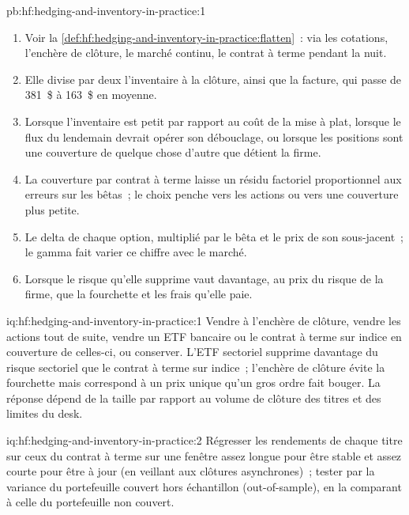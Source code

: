 \begin{solution}{pb:hf:hedging-and-inventory-in-practice:1}
\begin{enumerate}
\item Voir la \cref{def:hf:hedging-and-inventory-in-practice:flatten}~: via les cotations, l'enchère de clôture, le marché continu, le contrat à terme
pendant la nuit.
\item Elle divise par deux l'inventaire à la clôture, ainsi que la facture, qui passe de 381~\$ à 163~\$ en moyenne.
\item Lorsque l'inventaire est petit par rapport au coût de la mise à plat, lorsque le flux du lendemain devrait opérer son débouclage, ou lorsque les positions sont une couverture de
quelque chose d'autre que détient la firme.
\item La couverture par contrat à terme laisse un résidu factoriel proportionnel aux erreurs sur les bêtas~; le choix penche vers les actions ou vers une couverture plus petite.
\item Le delta de chaque option, multiplié par le bêta et le prix de son sous-jacent~; le gamma fait varier ce chiffre avec le marché.
\item Lorsque le risque qu'elle supprime vaut davantage, au prix du risque de la firme, que la fourchette et les frais qu'elle paie.
\end{enumerate}
\end{solution}

\begin{solution}{iq:hf:hedging-and-inventory-in-practice:1}
Vendre à l'enchère de clôture, vendre les actions tout de suite, vendre un ETF bancaire ou le contrat à terme sur indice en couverture de celles-ci, ou conserver. L'ETF sectoriel supprime davantage du
risque sectoriel que le contrat à terme sur indice~; l'enchère de clôture évite la fourchette mais correspond à un prix unique qu'un gros ordre fait bouger. La réponse dépend de la
taille par rapport au volume de clôture des titres et des limites du desk.
\end{solution}

\begin{solution}{iq:hf:hedging-and-inventory-in-practice:2}
Régresser les rendements de chaque titre sur ceux du contrat à terme sur une fenêtre assez longue pour être stable et assez courte pour être à jour (en veillant aux
clôtures asynchrones)~; tester par la variance du portefeuille couvert hors échantillon (out-of-sample), en la comparant à celle du portefeuille non couvert.
\end{solution}

